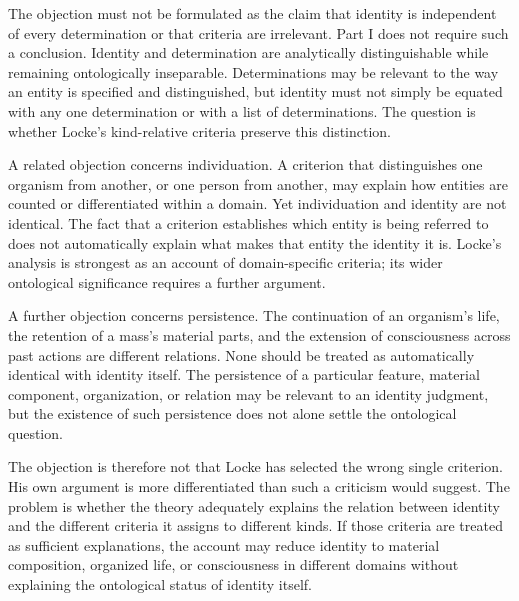 The objection must not be formulated as the
claim that identity is independent of every
determination or that criteria are irrelevant.
Part I does not require such a conclusion.
Identity and determination are analytically
distinguishable while remaining ontologically
inseparable. Determinations may be relevant
to the way an entity is specified and
distinguished, but identity must not simply
be equated with any one determination or
with a list of determinations. The question
is whether Locke's kind-relative criteria
preserve this distinction.

\label{para:VS.B01.P01.C08.S08.SS12.P003}

A related objection concerns individuation.
A criterion that distinguishes one organism
from another, or one person from another,
may explain how entities are counted or
differentiated within a domain. Yet
individuation and identity are not identical.
The fact that a criterion establishes
which entity is being referred to does
not automatically explain what makes that
entity the identity it is. Locke's analysis
is strongest as an account of domain-specific
criteria; its wider ontological significance
requires a further argument. 

\label{para:VS.B01.P01.C08.S08.SS12.P004}

A further objection concerns persistence.
The continuation of an organism's life,
the retention of a mass's material parts,
and the extension of consciousness across
past actions are different relations. None
should be treated as automatically identical
with identity itself. The persistence of
a particular feature, material component,
organization, or relation may be relevant
to an identity judgment, but the existence
of such persistence does not alone settle
the ontological question. 

\label{para:VS.B01.P01.C08.S08.SS12.P005}

The objection is therefore not that Locke
has selected the wrong single criterion.
His own argument is more differentiated
than such a criticism would suggest.
The problem is whether the theory adequately
explains the relation between identity and
the different criteria it assigns to
different kinds. If those criteria are
treated as sufficient explanations, the
account may reduce identity to material
composition, organized life, or consciousness
in different domains without explaining
the ontological status of identity itself.

